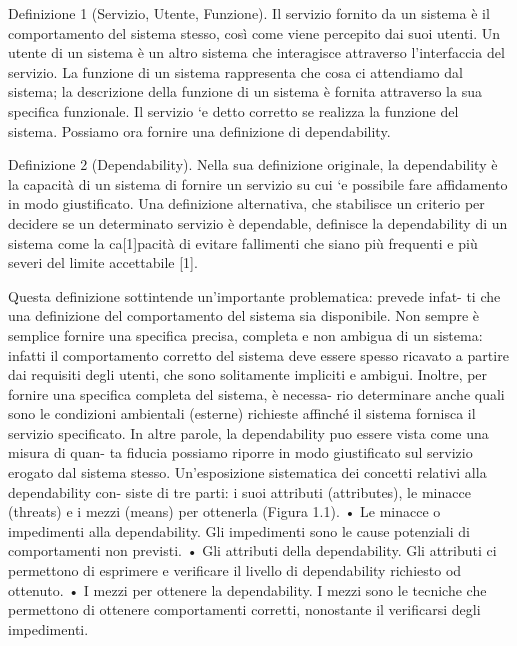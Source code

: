 \documentclass[14pt]{extarticle}
\begin{document}
Definizione 1 (Servizio, Utente, Funzione). Il servizio fornito da un sistema
è il comportamento del sistema stesso, così come viene percepito dai suoi utenti.
Un utente di un sistema è un altro sistema che interagisce attraverso l’interfaccia del
servizio. La funzione di un sistema rappresenta che cosa ci attendiamo dal sistema; la
descrizione della funzione di un sistema è fornita attraverso la sua specifica funzionale.
Il servizio `e detto corretto se realizza la funzione del sistema. 
Possiamo ora fornire una definizione di dependability.

Definizione 2 (Dependability). Nella sua definizione originale, la dependability è
la capacità di un sistema di fornire un servizio su cui `e possibile fare affidamento in
modo giustificato. 
Una definizione alternativa, che stabilisce un criterio per decidere se un
determinato servizio è dependable, definisce la dependability di un sistema
come la ca[1]pacità di evitare fallimenti che siano più frequenti e più severi del
limite accettabile [1].

Questa definizione sottintende un’importante problematica: prevede infat-
ti che una definizione del comportamento del sistema sia disponibile. Non
sempre è semplice fornire una specifica precisa, completa e non ambigua di
un sistema: infatti il comportamento corretto del sistema deve essere spesso
ricavato a partire dai requisiti degli utenti, che sono solitamente impliciti e
ambigui. Inoltre, per fornire una specifica completa del sistema, è necessa-
rio determinare anche quali sono le condizioni ambientali (esterne) richieste
affinché il sistema fornisca il servizio specificato.
In altre parole, la dependability puo essere vista come una misura di quan-
ta fiducia possiamo riporre in modo giustificato sul servizio erogato dal sistema
stesso. Un’esposizione sistematica dei concetti relativi alla dependability con-
siste di tre parti: i suoi attributi (attributes), le minacce (threats) e i mezzi
(means) per ottenerla (Figura 1.1).
• Le minacce o impedimenti alla dependability. Gli impedimenti sono le
cause potenziali di comportamenti non previsti.
• Gli attributi della dependability. Gli attributi ci permettono di esprimere
e verificare il livello di dependability richiesto od ottenuto.
• I mezzi per ottenere la dependability. I mezzi sono le tecniche che
permettono di ottenere comportamenti corretti, nonostante il verificarsi
degli impedimenti.
\end{document}

